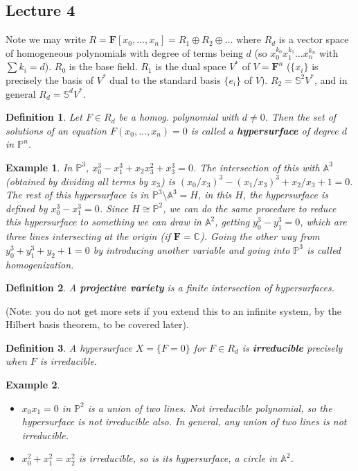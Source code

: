 \documentclass[12pt]{article}
\newcommand{\F}{\mathbf{F}}
\newcommand{\C}{\mathbb{C}}
\renewcommand{\P}{\mathbb{P}}
\newcommand{\A}{\mathbb{A}}
\newtheorem{definition}{Definition}[section]
\newtheorem*{example}{Example}
\begin{document}
    \subsection{Lecture 4} 
    Note we may write $R = \F[x_0, \dots, x_n] = R_1 \oplus R_2 \oplus \dots$ where $R_d$ is a vector space of homogeneous polynomials with degree of terms being $d$ (so $x_0^{k_0}x_1^{k_1} \dots x_n^{k_n}$ with $\sum k_i = d$). $R_0$ is the base field. $R_1$ is the dual space $V^*$ of $V = \F^n$ ($\{x_i\}$ is precisely the basis of $V^*$ dual to the standard basis $\{e_i\}$ of $V$). $R_2 = \mathbb{S}^2 V^*$, and in general $R_d = \mathbb{S}^d V^*$. 
    \begin{definition}
        Let $F \in R_d$ be a homog. polynomial with $d \neq 0$. Then the set of solutions of an equation $F(x_0, \dots, x_n) = 0$ is called a \textbf{hypersurface} of degree $d$ in $\P^n$.  
    \end{definition}
    \begin{example}
        In $\P^3$, $x_0^3 - x_1^3 + x_2x_3^2 + x_3^3 = 0$. The intersection of this with $\A^3$ (obtained by dividing all terms by $x_3$) is $(x_0/x_3)^3 - (x_1/x_3)^3 + x_2/x_3 + 1 = 0$. The rest of this hypersurface is in $\P^3 \setminus \A^3 = H$, in this $H$, the hypersurface is defined by $x_0^3 - x_1^3 = 0$. Since $H \cong \P^2$, we can do the same procedure to reduce this hypersurface to something we can draw in $\A^2$, getting $y_0^3 - y_1^3 = 0$, which are three lines intersecting at the origin (if $\F = \C$). Going the other way from $y_0^3 + y_1^3 + y_2 + 1 = 0$ by introducing another variable and going into $\P^3$ is called \textit{homogenization}. 
    \end{example}
    \begin{definition}
        A \textbf{projective variety} is a \textit{finite} intersection of hypersurfaces. 
    \end{definition}
    (Note: you do not get more sets if you extend this to an infinite system, by the Hilbert basis theorem, to be covered later). \par 
    \begin{definition}
        A hypersurface $X = \{F = 0\}$ for $F \in R_d$ is \textbf{irreducible} precisely when $F$ is irreducible. 
    \end{definition}
    \begin{example}
        \begin{itemize}
            \item $x_0x_1 = 0$ in $\P^2$ is a union of two lines. Not irreducible polynomial, so the hypersurface is not irreducible also. In general, any union of two lines is not irreducible. 
            \item $x_0^2 + x_1^2 = x_2^2$ is irreducible, so is its hypersurface, a circle in $\A^2$. 
        \end{itemize}
    \end{example}
\end{document}
